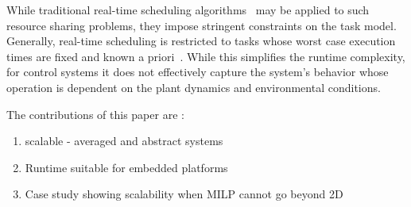 While traditional real-time scheduling algorithms~\cite{realtimesys} may be applied to such resource sharing problems, they impose stringent constraints on the task model.
Generally, real-time scheduling is restricted to tasks whose worst case execution times are fixed and known a priori~\cite{rts}.
While this simplifies the runtime complexity, for control systems it does not effectively capture the system's behavior whose operation is dependent on the plant dynamics and environmental conditions. 

The contributions of this paper are :
\begin{enumerate}
\item scalable - averaged and abstract systems
\item Runtime suitable for embedded platforms
\item Case study showing scalability when MILP cannot go beyond 2D
\end{enumerate}
 

